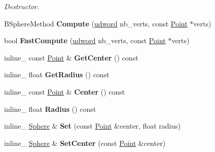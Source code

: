 \begin{DoxyCompactItemize}
\begin{DoxyCompactList}\small\item\em Destructor. \end{DoxyCompactList}\item 
B\+Sphere\+Method {\bfseries Compute} (\hyperlink{IceTypes_8h_a44c6f1920ba5551225fb534f9d1a1733}{udword} nb\+\_\+verts, const \hyperlink{classPoint}{Point} $\ast$verts)\hypertarget{classSphere_a7b0327da106f257ef3d8884c40de1c10}{}\label{classSphere_a7b0327da106f257ef3d8884c40de1c10}

\item 
bool {\bfseries Fast\+Compute} (\hyperlink{IceTypes_8h_a44c6f1920ba5551225fb534f9d1a1733}{udword} nb\+\_\+verts, const \hyperlink{classPoint}{Point} $\ast$verts)\hypertarget{classSphere_a02626e6da96a9bc369f856c6d59a5fc4}{}\label{classSphere_a02626e6da96a9bc369f856c6d59a5fc4}

\item 
inline\+\_\+ const \hyperlink{classPoint}{Point} \& {\bfseries Get\+Center} () const \hypertarget{classSphere_ac2be8d9da5fd8d641522de74d7610e11}{}\label{classSphere_ac2be8d9da5fd8d641522de74d7610e11}

\item 
inline\+\_\+ float {\bfseries Get\+Radius} () const \hypertarget{classSphere_a50981ae9e14b9a3eb8d28b3eb706dee5}{}\label{classSphere_a50981ae9e14b9a3eb8d28b3eb706dee5}

\item 
inline\+\_\+ const \hyperlink{classPoint}{Point} \& {\bfseries Center} () const \hypertarget{classSphere_ad6f248254eda133016e68295e28804ff}{}\label{classSphere_ad6f248254eda133016e68295e28804ff}

\item 
inline\+\_\+ float {\bfseries Radius} () const \hypertarget{classSphere_ad7d5648f647dd5b9f22d020e7565dc2d}{}\label{classSphere_ad7d5648f647dd5b9f22d020e7565dc2d}

\item 
inline\+\_\+ \hyperlink{classSphere}{Sphere} \& {\bfseries Set} (const \hyperlink{classPoint}{Point} \&center, float radius)\hypertarget{classSphere_adacae0c5838673b2798184a0a64620e2}{}\label{classSphere_adacae0c5838673b2798184a0a64620e2}

\item 
inline\+\_\+ \hyperlink{classSphere}{Sphere} \& {\bfseries Set\+Center} (const \hyperlink{classPoint}{Point} \&center)\hypertarget{classSphere_a220612055a1207030c85a060660d9492}{}\label{classSphere_a220612055a1207030c85a060660d9492}


\end{DoxyCompactItemize}
